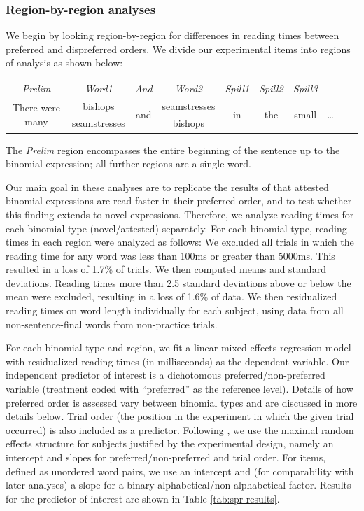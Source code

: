 \documentclass[authoryear]{elsarticle}
\begin{document}
\subsubsection{Region-by-region analyses}
We begin by looking region-by-region for differences in reading times between preferred and dispreferred orders. We divide our experimental items into regions of analysis as shown below:

\noindent\begin{tabular}{c c c c c c c c c c}
 \emph{Prelim} & \emph{Word1} & \emph{And} & \emph{Word2} & \emph{Spill1} & \emph{Spill2} & \emph{Spill3 } & \\
\multirow{2}{*}{There were many} & bishops & \multirow{2}{*}{and} & seamstresses & \multirow{2}{*}{in} & \multirow{2}{*}{the} & \multirow{2}{*}{small} & \multirow{2}{*}{\ldots}\\
&seamstresses&&bishops
\end{tabular}

\noindent The \emph{Prelim} region encompasses the entire beginning of the sentence up to the binomial expression; all further regions are a single word.

Our main goal in these analyses are to replicate the results of \citet{SiyanovaChanturia:2011ep} that attested binomial expressions are read faster in their preferred order, and to test whether this finding extends to novel expressions. Therefore, we analyze reading times for each binomial type (novel/attested) separately. For each binomial type, reading times in each region were analyzed as follows: We excluded all trials in which the reading time for any word was less than 100ms or greater than 5000ms. This resulted in a loss of 1.7\% of trials. We then computed means and standard deviations. Reading times more than 2.5 standard deviations above or below the mean were excluded, resulting in a loss of 1.6\% of data. We then residualized reading times on word length individually for each subject, using data from all non-sentence-final words from non-practice trials.

For each binomial type and region, we fit a linear mixed-effects regression model with residualized reading times (in milliseconds) as the dependent variable. Our independent predictor of interest is a dichotomous preferred/non-preferred variable (treatment coded with ``preferred'' as the reference level). Details of how preferred order is assessed vary between binomial types and are discussed in more details below. Trial order (the position in the experiment in which the given trial occurred) is also included as a predictor. Following \citet{Barr:2013vf}, we use the maximal random effects structure for subjects justified by the experimental design, namely an intercept and slopes for preferred/non-preferred and trial order. For items, defined as unordered word pairs, we use an intercept and (for comparability with later analyses) a slope for a binary alphabetical/non-alphabetical factor. Results for the predictor of interest are shown in Table \ref{tab:spr-results}.
\end{document}
